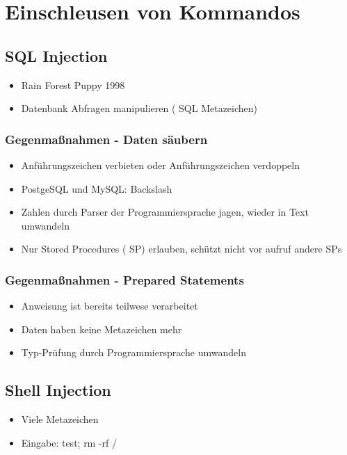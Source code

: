 \section*{Einschleusen von Kommandos}
\subsection*{ SQL Injection}
\begin{itemize}
	\item Rain Forest Puppy 1998
	\item Datenbank Abfragen manipulieren ( SQL Metazeichen)
\end{itemize}
\subsubsection*{ Gegenmaßnahmen - Daten säubern }
\begin{itemize}
	\item Anführungszeichen verbieten oder Anführungszeichen verdoppeln
	\item PostgeSQL und MySQL: Backslash \
	\item Zahlen durch Parser der Programmiersprache jagen, wieder in Text umwandeln
	\item Nur Stored Procedures ( SP) erlauben, schützt nicht vor aufruf andere SPs
\end{itemize}

\subsubsection*{Gegenmaßnahmen - Prepared Statements }
\begin{itemize}
	\item  Anweisung ist bereits teilwese verarbeitet
	\item Daten haben keine Metazeichen mehr
	\item Typ-Prüfung durch Programmiersprache umwandeln
\end{itemize}


\subsection*{ Shell Injection}
\begin{itemize}
	\item Viele Metazeichen
	\item Eingabe: test; rm -rf /
\end{itemize}
